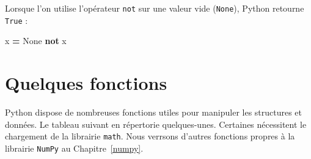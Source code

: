 \documentclass[12pt,]{book}
\newenvironment{Shaded}{\begin{snugshade}}{\end{snugshade}}
\newcommand{\KeywordTok}[1]{\textcolor[rgb]{0.13,0.29,0.53}{\textbf{#1}}}
\newcommand{\VariableTok}[1]{\textcolor[rgb]{0.00,0.00,0.00}{#1}}
\newcommand{\OperatorTok}[1]{\textcolor[rgb]{0.81,0.36,0.00}{\textbf{#1}}}
\newcommand{\NormalTok}[1]{#1}
\numberwithin{equation}{section}
\numberwithin{countremarque}{section}
\begin{document}
Lorsque l'on utilise l'opérateur \texttt{not} sur une valeur vide
(\texttt{None}), Python retourne \texttt{True} :

\begin{Shaded}
\begin{Highlighting}[]
\NormalTok{x }\OperatorTok{=} \VariableTok{None}
\KeywordTok{not}\NormalTok{ x}
\end{Highlighting}
\end{Shaded}

\section{Quelques fonctions}\label{quelques-fonctions}

Python dispose de nombreuses fonctions utiles pour manipuler les
structures et données. Le tableau suivant en répertorie quelques-unes.
Certaines nécessitent le chargement de la librairie \texttt{math}. Nous
verrsons d'autres fonctions propres à la librairie \texttt{NumPy} au
Chapitre~\ref{numpy}.
\end{document}
